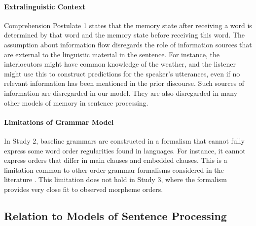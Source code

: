 \paragraph{Extralinguistic Context}
Comprehension Postulate 1 states that the memory state after receiving a word is determined by that word and the memory state before receiving this word.
The assumption about information flow disregards the role of information sources that are external to the linguistic material in the sentence.
For instance, the interlocutors might have common knowledge of the weather, and the listener might use this to construct predictions for the speaker's utterances, even if no relevant information has been mentioned in the prior discourse.
Such sources of information are disregarded in our model.
They are also disregarded in many other models of memory in sentence processing.


\paragraph{Limitations of Grammar Model}
In Study 2, baseline grammars are constructed in a formalism that cannot fully express some word order regularities found in languages.
For instance, it cannot express orders that differ in main clauses and embedded clauses.
This is a limitation common to other order grammar formalisms considered in the literature \citep{gildea-optimizing-2007,futrell2015experiments,wang2016galactic}.
This limitation does not hold in Study 3, where the formalism provides very close fit to observed morpheme orders.



\subsection{Relation to Models of Sentence Processing}
\label{sec:sentprod-models}

